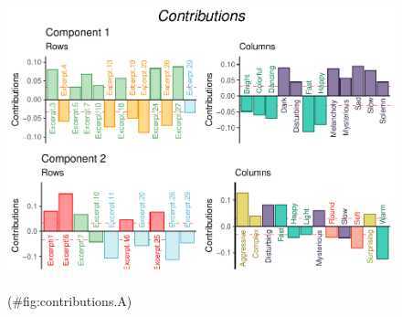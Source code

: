 \documentclass[
  english,
  man,floatsintext]{apa6}
\begin{document}
\begin{figure}

{\centering \includegraphics{Music-Descriptor-Space_files/figure-latex/contributions.A-1} 

}

\caption{ }(\#fig:contributions.A)
\end{figure}
\end{document}
